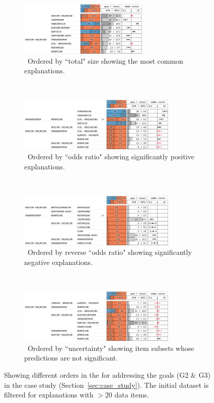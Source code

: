\begin{figure}
\centering
\begin{subfigure}[b]{\linewidth}
    \hfill
    \includegraphics[height=7em]{explainer/expl_10_size}
    \caption{~Ordered by ``total" size showing the most common explanations.}
    \label{figs:expl_10_size}
\end{subfigure}
\\
\begin{subfigure}[b]{\linewidth}
    \hfill
    \includegraphics[height=7em]{explainer/expl_10_or_pos}
    \caption{~Ordered by ``odds ratio" showing significantly positive explanations.}
    \label{figs:expl_10_or_pos}
\end{subfigure}%
\\
\begin{subfigure}[b]{\linewidth}
    \hfill
    \includegraphics[height=7em]{explainer/expl_10_or_neg}
    \caption{~Ordered by reverse ``odds ratio" showing significantly negative explanations.}
    \label{figs:expl_10_or_neg}
\end{subfigure}%
\\
\begin{subfigure}[b]{\linewidth}
    \hfill
    \includegraphics[height=7em]{explainer/expl_new_uncertain}
    \caption{~Ordered by ``uncertainty" showing item subsets whose predictions are not significant.}
    \label{figs:expl_10_uncertain}
\end{subfigure}
\caption[Showing different orders in the \tabB.]{
Showing different orders in the \textbf{\tabB} for addressing the goals (G2 \& G3) in the case study (Section~\ref{sec:case_study}). The initial dataset is filtered for explanations with $> 20$ data items.
}
\end{figure}